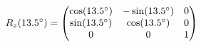 \documentclass[preview]{standalone}
\begin{document}
\begin{align*}
\special{dvisvgm:raw <g id='unique000'>}R_z(13.5^\circ) = \begin{pmatrix} \cos(13.5^\circ) & -\sin(13.5^\circ) & 0 \\ \sin(13.5^\circ) & \cos(13.5^\circ) & 0 \\ 0 & 0 & 1 \end{pmatrix}\special{dvisvgm:raw </g>}
\end{align*}
\end{document}
